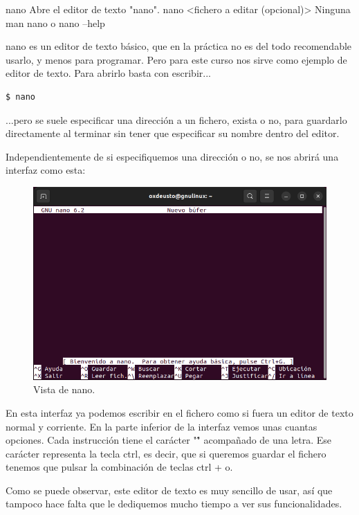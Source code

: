 \begin{command-info}
{nano}
{Abre el editor de texto "nano".}
{nano <fichero a editar (opcional)>}
{Ninguna}
{man nano o nano --help}
\end{command-info}

nano es un editor de texto básico, que en la práctica no es del todo recomendable usarlo, y menos para programar. Pero para este curso nos sirve como ejemplo de editor de texto. Para abrirlo basta con escribir...

\begin{tcolorbox-code}
\begin{lstlisting}
$ nano
\end{lstlisting}
\end{tcolorbox-code}

...pero se suele especificar una dirección a un fichero, exista o no, para guardarlo directamente al terminar sin tener que especificar su nombre dentro del editor.

Independientemente de si especifiquemos una dirección o no, se nos abrirá una interfaz como esta:

\begin{figure}[H]
    \centering
    \includegraphics[width=0.80\linewidth]{resources/images/nano.png}
    \caption{Vista de nano.}
\end{figure}

En esta interfaz ya podemos escribir en el fichero como si fuera un editor de texto normal y corriente. En la parte inferior de la interfaz vemos unas cuantas opciones. Cada instrucción tiene el carácter "\^" acompañado de una letra. Ese carácter representa la tecla ctrl, es decir, que si queremos guardar el fichero tenemos que pulsar la combinación de teclas ctrl + o.

Como se puede observar, este editor de texto es muy sencillo de usar, así que tampoco hace falta que le dediquemos mucho tiempo a ver sus funcionalidades.

